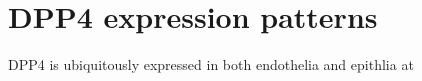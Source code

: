 \section{DPP4 expression patterns}
DPP4 is ubiquitously expressed in both endothelia and epithlia at 